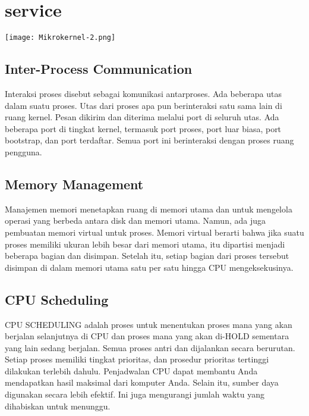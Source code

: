 \section{service}
\texttt{[image: Mikrokernel-2.png]}


\subsection{Inter-Process Communication}

Interaksi proses disebut sebagai komunikasi antarproses. Ada beberapa utas dalam suatu proses. Utas dari proses apa pun berinteraksi satu sama lain di ruang kernel. Pesan dikirim dan diterima melalui port di seluruh utas. Ada beberapa port di tingkat kernel, termasuk port proses, port luar biasa, port bootstrap, dan port terdaftar. Semua port ini berinteraksi dengan proses ruang pengguna.

\subsection{Memory Management}

Manajemen memori menetapkan ruang di memori utama dan untuk mengelola operasi yang berbeda antara disk dan memori utama. Namun, ada juga pembuatan memori virtual untuk proses. Memori virtual berarti bahwa jika suatu proses memiliki ukuran lebih besar dari memori utama, itu dipartisi menjadi beberapa bagian dan disimpan. Setelah itu, setiap bagian dari proses tersebut disimpan di dalam memori utama satu per satu hingga CPU mengeksekusinya.

\subsection{CPU Scheduling}

CPU SCHEDULING adalah proses untuk menentukan proses mana yang akan berjalan selanjutnya di CPU dan proses mana yang akan di-HOLD sementara yang lain sedang berjalan. Semua proses antri dan dijalankan secara berurutan. Setiap proses memiliki tingkat prioritas, dan prosedur prioritas tertinggi dilakukan terlebih dahulu. Penjadwalan CPU dapat membantu Anda mendapatkan hasil maksimal dari komputer Anda. Selain itu, sumber daya digunakan secara lebih efektif. Ini juga mengurangi jumlah waktu yang dihabiskan untuk menunggu.

\vskip0.5cm

